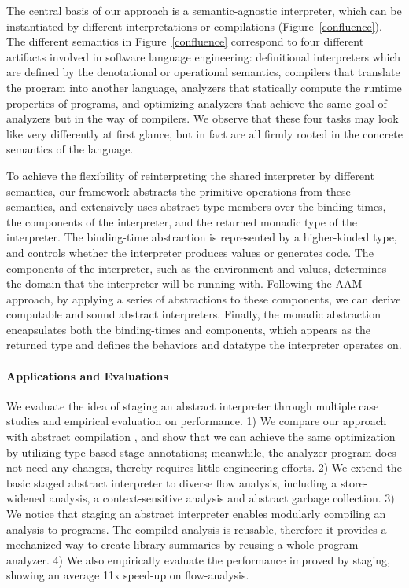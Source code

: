 The central basis of our approach is a semantic-agnostic interpreter, which can be
instantiated by different interpretations or compilations (Figure~\ref{confluence}).
The different semantics in Figure~\ref{confluence} correspond to four different
artifacts involved in software language engineering: definitional interpreters
which are defined by the denotational or operational semantics, compilers that
translate the program into another language, analyzers that statically compute the
runtime properties of programs, and optimizing analyzers that achieve the same goal
of analyzers but in the way of compilers. We observe that these four
tasks may look like very differently at first glance, but in fact are
all firmly rooted in the concrete semantics of the language.

To achieve the flexibility of reinterpreting the shared interpreter by
different semantics, our framework abstracts the primitive operations
from these semantics, and extensively uses abstract type members over
the binding-times, the components of the interpreter, and the returned
monadic type of the interpreter. The binding-time abstraction is
represented by a higher-kinded type, and controls whether the
interpreter produces values or generates code. The components of the
interpreter, such as the environment and values, determines the domain
that the interpreter will be running with. Following the AAM approach,
by applying a series of abstractions to these components, we can
derive computable and sound abstract interpreters. Finally, the
monadic abstraction encapsulates both the binding-times and
components, which appears as the returned type and defines the
behaviors and datatype the interpreter operates on.

\paragraph{Applications and Evaluations}
We evaluate the idea of staging an abstract interpreter through
multiple case studies and empirical evaluation on performance.
1) We compare our approach with abstract compilation
\cite{Boucher:1996:ACN:647473.727587}, and show that we can achieve
the same optimization by utilizing type-based stage annotations;
meanwhile, the analyzer program does not need any changes, thereby
requires little engineering efforts.
2) We extend the basic staged abstract interpreter to diverse flow
analysis, including a store-widened analysis, a context-sensitive
analysis and abstract garbage collection.
3) We notice that staging an abstract interpreter enables modularly
compiling an analysis to programs. The compiled analysis is reusable,
therefore it provides a mechanized way to create library summaries by
reusing a whole-program analyzer.
4) We also empirically evaluate the performance improved by staging,
showing an average 11x speed-up on flow-analysis.

